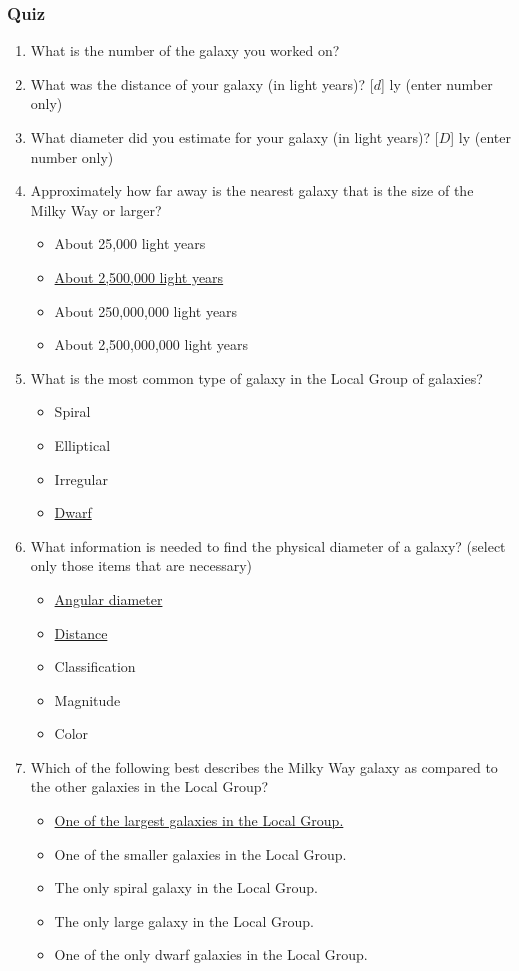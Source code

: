 \documentclass[12pt]{article}
\begin{document}
\subsubsection{Quiz}
\begin{enumerate}
\item
What is the number of the galaxy you worked on?
\item
What was the distance of your galaxy (in light years)? [$d$] ly (enter number only)
\item
What diameter did you estimate for your galaxy (in light years)? [$D$] ly (enter number only)
\item
Approximately how far away is the nearest galaxy that is the size of the Milky Way or larger?
\begin{itemize}
    \item About 25,000 light years
    \item \underline{About 2,500,000 light years}
    \item About 250,000,000 light years
    \item About 2,500,000,000 light years
\end{itemize}
\item
What is the most common type of galaxy in the Local Group of galaxies?
\begin{itemize}
    \item Spiral
    \item Elliptical
    \item Irregular
    \item \underline{Dwarf}
\end{itemize}
\item
What information is needed to find the physical diameter of a galaxy? (select only those items that are necessary)
\begin{itemize}
    \item \underline{Angular diameter}
    \item \underline{Distance}
    \item Classification
    \item Magnitude
    \item Color
\end{itemize}
\item
Which of the following best describes the Milky Way galaxy as compared to the other galaxies in the Local Group?
\begin{itemize}
    \item \underline{One of the largest galaxies in the Local Group.}
    \item One of the smaller galaxies in the Local Group.
    \item The only spiral galaxy in the Local Group.
    \item The only large galaxy in the Local Group.
    \item One of the only dwarf galaxies in the Local Group.
\end{itemize}
\end{enumerate}
\end{document}
